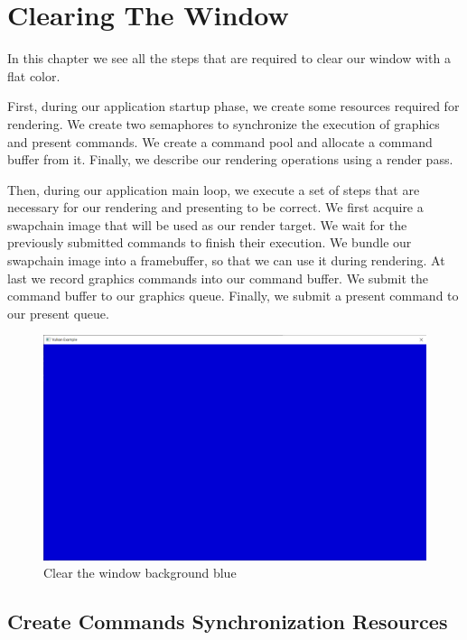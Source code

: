 \chapter{Clearing The Window}

In this chapter we see all the steps that are required to clear our
window with a flat color.

First, during our application startup phase, we create some resources
required for rendering.
We create two semaphores to synchronize the execution of graphics and present
commands.
We create a command pool and allocate a command buffer from it.
Finally, we describe our rendering operations using a render pass.

Then, during our application main loop, we execute a set of steps
that are necessary for our rendering and presenting to be correct.
We first acquire a swapchain image that will be used as our render target.
We wait for the previously submitted commands to finish their execution.
We bundle our swapchain image into a framebuffer, so that we can use it
during rendering.
At last we record graphics commands into our command buffer.
We submit the command buffer to our graphics queue.
Finally, we submit a present command to our present queue.

\begin{figure}[ht]
    \centering
    \includegraphics[scale=0.20]{images/ChClearWindow/ClearWindow.png}
    \caption{Clear the window background blue}
    \label{fig::ClearWindow}
\end{figure}

\section{Create Commands Synchronization Resources}

